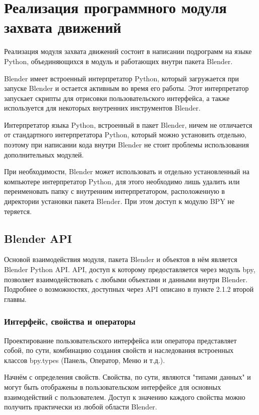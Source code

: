 \section{Реализация программного модуля захвата движений}

Реализация модуля захвата движений состоит в написании подрограмм на языке Python, объединяющихся в модуль и работающих внутри пакета Blender.

Blender имеет встроенный интерпретатор Python, который загружается при запуске Blender и остается активным во время его работы. Этот интерпретатор запускает скрипты для отрисовки пользовательского интерфейса, а также используется для некоторых внутренних инструментов Blender.

Интерпретатор языка Python, встроенный в пакет Blender, ничем не отличается от стандартного интерпретатора Python, который можно установить отдельно, поэтому при написании кода внутри Blender не стоит проблемы использования дополнительных модулей.

При необходимости, Blender может использовать и отдельно установленный на компьютере интерпретатор Python, для этого необходимо лишь удалить или переименовать папку с внутренним интерпретатором, расположенную в директории установки пакета Blender. При этом доступ к модулю BPY не теряется.

\subsection {Blender API}

Основой взаимодействия модуля, пакета Blender и объектов в нём является Blender Python API. API, доступ к которому предоставляется через модуль bpy, позволяет взаимодействовать с любыми объектами и данными внутри Blender. Подробнее о возможностях, доступных через API описано в пункте 2.1.2 второй главвы.

\subsubsection{Интерфейс, свойства и операторы}

Проектирование пользовательского интерфейса или оператора представляет собой, по сути, комбинацию создания свойств и наследования встроенных классов bpy.types (Панель, Оператор, Меню и т.д.).

Начнём с определения свойств. Свойства, по сути, являются "типами данных" и могут быть отображены в пользовательском интерфейсе для основных взаимодействий с пользователем. Доступ к значению каждого свойства можно получить практически из любой области Blender. 


